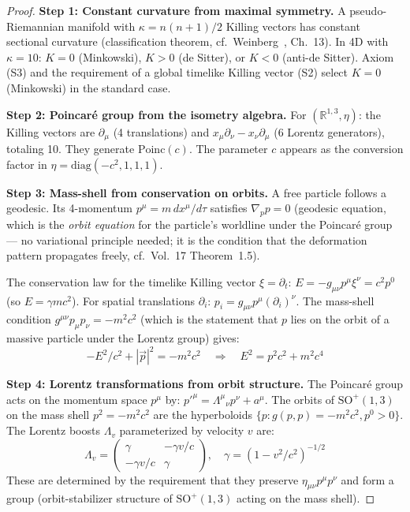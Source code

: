 \documentclass[11pt,twocolumn]{article}
\theoremstyle{plain}\newtheorem{theorem}{Theorem}\newtheorem{proposition}[theorem]{Proposition}\newtheorem{corollary}[theorem]{Corollary}\newtheorem{lemma}[theorem]{Lemma}
\theoremstyle{definition}\newtheorem{definition}[theorem]{Definition}
\theoremstyle{remark}\newtheorem{remark}[theorem]{Remark}
\newcommand{\Poinc}{\mathrm{Poinc}}
\begin{document}
\begin{proof}
\textbf{Step 1: Constant curvature from maximal symmetry.}
A pseudo-Riemannian manifold with $\kappa = n(n+1)/2$ Killing vectors has constant sectional curvature (classification theorem, cf.\ Weinberg~\cite{weinberg1972}, Ch.~13). In 4D with $\kappa = 10$: $K = 0$ (Minkowski), $K > 0$ (de Sitter), or $K < 0$ (anti-de Sitter). Axiom (S3) and the requirement of a global timelike Killing vector (S2) select $K = 0$ (Minkowski) in the standard case.

\textbf{Step 2: Poincar\'e group from the isometry algebra.}
For $(\mathbb{R}^{1,3}, \eta)$: the Killing vectors are $\partial_\mu$ (4 translations) and $x_\mu\partial_\nu - x_\nu\partial_\mu$ (6 Lorentz generators), totaling 10. They generate $\Poinc(c)$. The parameter $c$ appears as the conversion factor in $\eta = \mathrm{diag}(-c^2, 1, 1, 1)$.

\textbf{Step 3: Mass-shell from conservation on orbits.}
A free particle follows a geodesic. Its 4-momentum $p^\mu = m\,dx^\mu/d\tau$ satisfies $\nabla_p p = 0$ (geodesic equation, which is the \emph{orbit equation} for the particle's worldline under the Poincaré group --- no variational principle needed; it is the condition that the deformation pattern propagates freely, cf.\ Vol.~17 Theorem~1.5).

The conservation law for the timelike Killing vector $\xi = \partial_t$: $E = -g_{\mu\nu}p^\mu\xi^\nu = c^2 p^0$ (so $E = \gamma m c^2$). For spatial translations $\partial_i$: $p_i = g_{\mu\nu}p^\mu(\partial_i)^\nu$. The mass-shell condition $g^{\mu\nu}p_\mu p_\nu = -m^2c^2$ (which is the statement that $p$ lies on the orbit of a massive particle under the Lorentz group) gives:
\begin{equation}
-E^2/c^2 + |\vec{p}|^2 = -m^2c^2 \quad \Rightarrow \quad E^2 = p^2c^2 + m^2c^4
\end{equation}

\textbf{Step 4: Lorentz transformations from orbit structure.}
The Poincar\'e group acts on the momentum space $p^\mu$ by: $p'^\mu = \Lambda^\mu{}_\nu p^\nu + a^\mu$. The orbits of $\mathrm{SO}^+(1,3)$ on the mass shell $p^2 = -m^2c^2$ are the hyperboloids $\{p : g(p,p) = -m^2c^2, p^0 > 0\}$. The Lorentz boosts $\Lambda_v$ parameterized by velocity $v$ are:
\begin{equation}
\Lambda_v = \begin{pmatrix} \gamma & -\gamma v/c \\ -\gamma v/c & \gamma \end{pmatrix}, \quad \gamma = (1-v^2/c^2)^{-1/2}
\end{equation}
These are determined by the requirement that they preserve $\eta_{\mu\nu}p^\mu p^\nu$ and form a group (orbit-stabilizer structure of $\mathrm{SO}^+(1,3)$ acting on the mass shell).
\end{proof}
\end{document}
